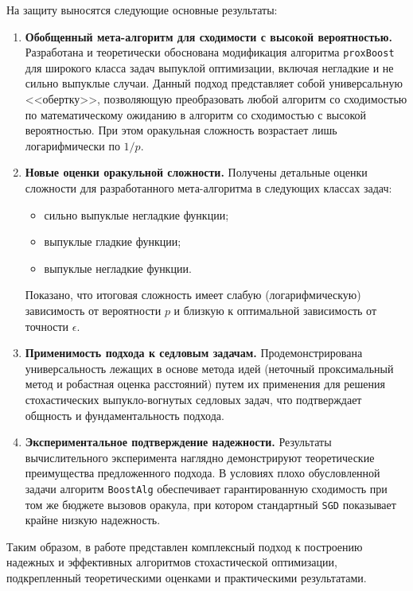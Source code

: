 На защиту выносятся следующие основные результаты:

\begin{enumerate}
    \item \textbf{Обобщенный мета-алгоритм для сходимости с высокой вероятностью.} Разработана и теоретически обоснована модификация алгоритма \texttt{proxBoost} для широкого класса задач выпуклой оптимизации, включая негладкие и не сильно выпуклые случаи. Данный подход представляет собой универсальную <<обертку>>, позволяющую преобразовать любой алгоритм со сходимостью по математическому ожиданию в алгоритм со сходимостью с высокой вероятностью. При этом оракульная сложность возрастает лишь логарифмически по $1/p$.

    \item \textbf{Новые оценки оракульной сложности.} Получены детальные оценки сложности для разработанного мета-алгоритма в следующих классах задач:
    \begin{itemize}
        \item сильно выпуклые негладкие функции;
        \item выпуклые гладкие функции;
        \item выпуклые негладкие функции.
    \end{itemize}
    Показано, что итоговая сложность имеет слабую (логарифмическую) зависимость от вероятности  $p$ и близкую к оптимальной зависимость от точности $\epsilon$.

    \item \textbf{Применимость подхода к седловым задачам.} Продемонстрирована универсальность лежащих в основе метода идей (неточный проксимальный метод и робастная оценка расстояний) путем их применения для решения стохастических выпукло-вогнутых седловых задач, что подтверждает общность и фундаментальность подхода.

    \item \textbf{Экспериментальное подтверждение надежности.} Результаты вычислительного эксперимента наглядно демонстрируют теоретические преимущества предложенного подхода. В условиях плохо обусловленной задачи алгоритм \texttt{BoostAlg} обеспечивает гарантированную сходимость при том же бюджете вызовов оракула, при котором стандартный \texttt{SGD} показывает крайне низкую надежность.
\end{enumerate}

Таким образом, в работе представлен комплексный подход к построению надежных и эффективных алгоритмов стохастической оптимизации, подкрепленный теоретическими оценками и практическими результатами.






\printbibliography[heading=bibintoc]
	

